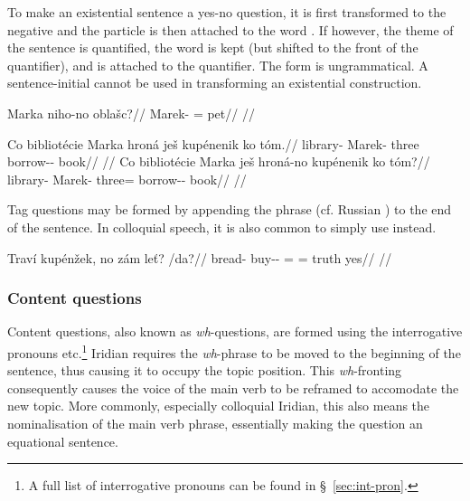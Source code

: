 To make an existential sentence a yes-no question, it is first transformed to the negative and the particle  is then attached to the word . If however, the theme of the sentence is quantified, the word  is kept (but shifted to the front of the quantifier), and  is attached to the quantifier. The form  is ungrammatical. A sentence-initial  cannot be used in transforming an existential construction.

\pex
\begingl
\gla Marka niho-no oblašc?//
\glb Marek-\Acc{} \N{}\Exst{}=\Q{} pet//
\glft {}//
\endgl
\xe

\pex
\a
\begingl
\gla Co bibliotécie Marka hroná ješ kupénenik ko tóm.//
\glb \Abl{} library-\Gen{} Marek-\Acc{} three \Exst{} borrow-\Pv{}-\Pf{} \Lnk{} book//
\glft {}//
\endgl
\a
\begingl
\gla Co bibliotécie Marka ješ hroná-no kupénenik ko tóm?//
\glb \Abl{} library-\Gen{} Marek-\Acc{} \Exst{} three=\Q{} borrow-\Pv{}-\Pf{} \Lnk{} book//
\glft {}//
\endgl
\xe

Tag questions may be formed by appending the phrase  (cf. Russian ) to the end of the sentence. In colloquial speech, it is also common to simply use  instead.

\pex
\begingl
\gla Traví kupénžek, no zám le\v{t}? /da?//
\glb bread-\Gen{} buy-\Av{}-\Pf{} \Q{}= \Neg{}= truth yes//
\glft {}//
\endgl
\xe

\subsubsection{Content questions}

Content questions, also known as \emph{wh}-questions, are formed using the interrogative pronouns    etc.\footnote{
  A full list of interrogative pronouns can be found in \S~\ref{sec:int-pron}.
} Iridian requires the \emph{wh}-phrase to be moved to the beginning of the sentence, thus causing it to occupy the topic position. This \emph{wh}-fronting consequently causes the voice of the main verb to be reframed to accomodate the new topic. More commonly, especially colloquial Iridian, this also means the nominalisation of the main verb phrase, essentially making the question an equational sentence.

